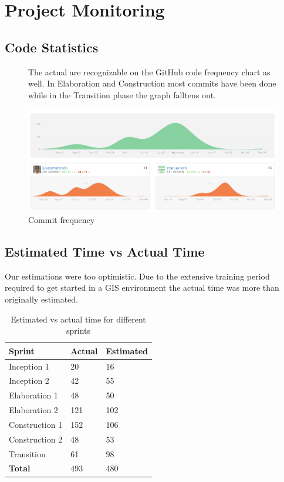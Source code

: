 \chapter{Project Monitoring}\label{project monitoring}

\section{Code Statistics}

\begin{figure}[h]

The actual  are recognizable on the GitHub code frequency chart as well. In Elaboration and Construction most commits have been done while in the Transition phase the graph falltens out.

  \centering
  \includegraphics[width=1\textwidth]{images/github_commits.png}
  \caption{Commit frequency}
\end{figure}

\section{Estimated Time vs Actual Time}

Our estimations were too optimistic. Due to the extensive
training period required to get started in a GIS environment
the actual time was more than originally estimated.


\begin{table}[H]
    \begin{tabular}{lll}
    \textbf{Sprint}        & \textbf{Actual} & \textbf{Estimated} \\
     \hline
    Inception 1    & 20     & 16        \\
    Inception 2    & 42     & 55        \\
    Elaboration 1  & 48     & 50        \\
    Elaboration 2  & 121    & 102       \\
    Construction 1 & 152    & 106         \\
    Construction 2 & 48     & 53        \\
    Transition     & 61 & 98        \\
    \hline
    \textbf{Total}          & 493 & 480 \\
    \end{tabular}
    \caption{Estimated vs actual time for different sprints}
\end{table}

